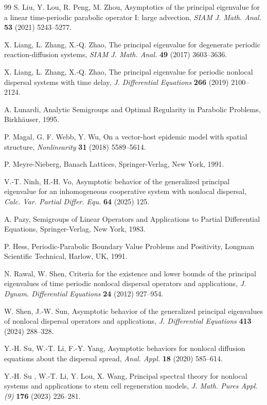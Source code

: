 \documentclass[11pt,reqno]{amsart}
\numberwithin{equation}{section}
\begin{document}
\begin{thebibliography}{99}
S. Liu, Y. Lou, R. Peng, M. Zhou, Asymptotics of the principal eigenvalue for a linear time-periodic parabolic operator I: large advection, \emph{SIAM J. Math. Anal.} {\bf 53} (2021) 5243--5277.


 X. Liang, L. Zhang, X.-Q. Zhao, The principal eigenvalue for degenerate periodic
reaction-diffusion systems, \emph{SIAM J. Math. Anal.} {\bf 49} (2017) 3603--3636.

 X. Liang, L. Zhang, X.-Q. Zhao, The principal eigenvalue for periodic nonlocal dispersal systems with time delay, \emph{J. Differential Equations} {\bf 266} (2019) 2100--2124.


 A. Lunardi, Analytic Semigroups and Optimal Regularity in Parabolic Problems, Birkh\"auser, 1995.

 P. Magal, G. F. Webb, Y. Wu, On a vector-host epidemic model with spatial structure, \emph{Nonlinearity} {\bf 31} (2018) 5589--5614.

P. Meyre-Nieberg, Banach Lattices, Springer-Verlag, New York, 1991.


V.-T. Ninh, H.-H. Vo, Asymptotic behavior of the generalized principal eigenvalue for an inhomogeneous cooperative
system with nonlocal dispersal, \emph{Calc. Var. Partial Differ. Equ.} {\bf 64} (2025) 125.


A. Pazy, Semigroups of Linear Operators and Applications to Partial Differential Equations, Springer-Verlag, New York, 1983.

P. Hess, Periodic-Parabolic Boundary Value Problems and Positivity, Longman Scientific
Technical, Harlow, UK, 1991.

N. Rawal, W. Shen, Criteria for the existence and lower bounds of the principal eigenvalues of time periodic nonlocal dispersal operators and applications, \emph{J. Dynam. Differential Equations} {\bf 24} (2012) 927--954.

 W. Shen, J.-W. Sun, Asymptotic behavior of the generalized principal eigenvalues of nonlocal dispersal operators and applications, \emph{J. Differential Equations} {\bf 413} (2024) 288--328.

 Y.-H. Su, W.-T. Li, F.-Y. Yang, Asymptotic behaviors for nonlocal diffusion equations about the dispersal spread, \emph{Anal. Appl.} {\bf 18} (2020) 585--614.

Y.-H. Su , W.-T. Li, Y. Lou, X. Wang, Principal spectral theory for nonlocal systems and applications to stem cell regeneration models, \emph{J. Math. Pures Appl. (9)} {\bf 176} (2023) 226--281.


\end{thebibliography}
\end{document}
